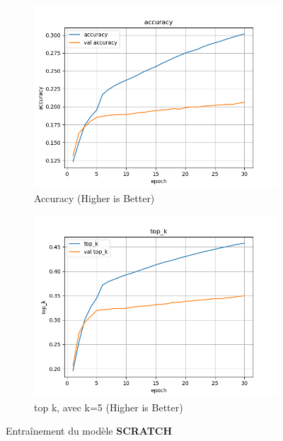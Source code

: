 \documentclass[a4paper]{article}
\begin{document}
\begin{figure}[ht]
  \begin{subfigure}{0.47\textwidth}
    \includegraphics[width=\linewidth]{../logs/learnfromscratch_1/accuracy.png}
    \caption{Accuracy (Higher is Better)}
  \end{subfigure}
  \hfill
  \begin{subfigure}{0.47\textwidth}
    \includegraphics[width=\linewidth]{../logs/learnfromscratch_1/top_k.png}
    \caption{top k, avec k=5 (Higher is Better)}
  \end{subfigure}
  \caption{Entraînement du modèle \textbf{SCRATCH}}
  \label{subfig:result model 2}
\end{figure}
\end{document}
